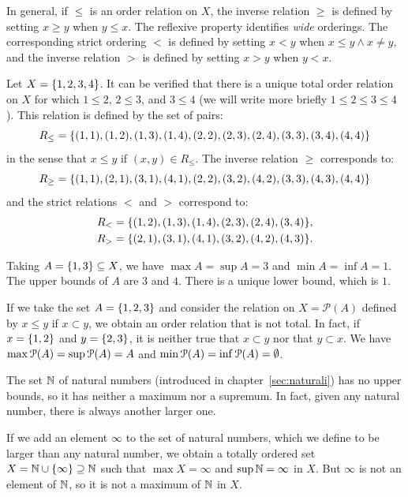 In general, if $\le$ is an order relation on $X$, the inverse relation $\ge$ is
defined by setting $x\ge y$ when $y\le x$. The reflexive property identifies
\emph{wide} orderings. The corresponding strict ordering $<$ is defined by
setting $x < y$ when $x\le y \land x\neq y$, and the inverse relation $>$ is
defined by setting $x>y$ when $y<x$.

\begin{example} 
  Let $X=\ENCLOSE{1,2,3,4}$. 
    It can be verified that there is a unique total order relation on $X$ for
  which $1 \le 2$, $2 \le 3$, and $3 \le 4$ (we will write more briefly $1 \le 2
  \le 3 \le 4$).
  This relation is defined by the set of pairs:
  \[
    R_\le = \ENCLOSE{
          (1,1),(1,2),(1,3),(1,4),
          (2,2),(2,3),(2,4),
          (3,3),(3,4),
          (4,4)}
  \]
  in the sense that $x\le y$ if $(x,y)\in R_\le$.
  The inverse relation $\ge$ corresponds to:
  \[
    R_\ge = \ENCLOSE{
          (1,1),(2,1),(3,1),(4,1),
          (2,2),(3,2),(4,2),
          (3,3),(4,3),
          (4,4)}
  \]
  and the strict relations $<$ and $>$ correspond to:
  \begin{align*}
    R_< &= \ENCLOSE{
          (1,2),(1,3),(1,4),
          (2,3),(2,4),
          (3,4)}, \\
    R_> &= \ENCLOSE{
          (2,1),(3,1),(4,1),
          (3,2),(4,2),
          (4,3)}.
  \end{align*}

  Taking $A=\ENCLOSE{1,3}\subset X$, we have $\max A = \sup A = 3$ and 
  $\min A = \inf A = 1$.
  The upper bounds of $A$ are $3$ and $4$. 
  There is a unique lower bound, which is $1$.
\end{example}

\begin{example}
If we take the set $A=\ENCLOSE{1,2,3}$ and consider the relation on $X=\mathcal
P(A)$ defined by $x\le y$ if $x\subset y$, we obtain an order relation that is
not total.
In fact, if $x=\ENCLOSE{1,2}$ and $y=\ENCLOSE{2,3}$, it is neither true that
$x\subset y$ nor that $y\subset x$.
We have $\max \P(A) = \sup \P(A) = A$ and $\min \P(A) = \inf \P(A) = \emptyset$.
\end{example}

\begin{example}
The set $\NN$ of natural numbers (introduced in chapter~\ref{sec:naturali}) has
no upper bounds, so it has neither a maximum nor a supremum.
In fact, given any natural number, there is always another larger one.

If we add an element $\infty$ to the set of natural numbers, which we define to
be larger than any natural number, we obtain a totally ordered set
$X=\NN\cup\ENCLOSE{\infty}\supset \NN$ such that $\max X = \infty$ and $\sup \NN
= \infty$ in $X$. But $\infty$ is not an element of $\NN$, so it is not a
maximum of $\NN$ in $X$.
\end{example}

